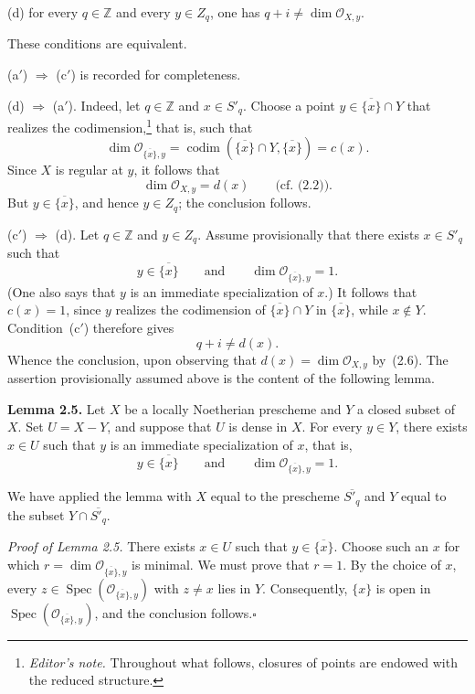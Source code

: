 \documentclass[10pt,a4paper]{article}
\newcommand{\cO}{\mathcal O}
\newcommand{\Spec}{\operatorname{Spec}}
\newcommand{\codim}{\operatorname{codim}}
\newcommand{\markedfootnote}[2]{\begingroup\renewcommand{\thefootnote}{#1}\footnote{#2}\endgroup}
\theoremstyle{sgatheorem}
\theoremstyle{plain}
\numberwithin{equation}{section}
\begin{document}
\medskip
\noindent\textup{(d)} for every $q\in\mathbb Z$ and every $y\in Z_q$,
one has $q+i\ne\dim\cO_{X,y}$.

\medskip
\noindent These conditions are equivalent.

\smallskip
\noindent\textup{(a$'$)} $\Rightarrow$ \textup{(c$'$)} is recorded for
completeness.

\smallskip
\noindent\textup{(d)} $\Rightarrow$ \textup{(a$'$)}. Indeed, let
$q\in\mathbb Z$ and $x\in S'_q$. Choose a point
$y\in\overline{\{x\}}\cap Y$ that realizes the
codimension,\markedfootnote{(6)}{\textit{Editor's note.} Throughout what
follows, closures of points are endowed with the reduced structure.} that is,
such that
\begin{equation}
  \dim\cO_{\overline{\{x\}},y}
  =\codim(\overline{\{x\}}\cap Y,\overline{\{x\}})=c(x).
  \tag{2.5}
\end{equation}
Since $X$ is regular at $y$, it follows that
\begin{equation}
  \dim\cO_{X,y}=d(x)\qquad\text{(cf.~(2.2)).}
  \tag{2.6}
\end{equation}
But $y\in\overline{\{x\}}$, and hence $y\in Z_q$; the conclusion follows.

\smallskip
\noindent\textup{(c$'$)} $\Rightarrow$ \textup{(d)}. Let $q\in\mathbb Z$
and $y\in Z_q$. Assume provisionally that there exists $x\in S'_q$ such
that
\[
  y\in\overline{\{x\}}\qquad\text{and}\qquad
  \dim\cO_{\overline{\{x\}},y}=1.
\]
(One also says that $y$ is an immediate specialization of $x$.) It follows
that $c(x)=1$, since $y$ realizes the codimension of
$\overline{\{x\}}\cap Y$ in $\overline{\{x\}}$, while $x\notin Y$.
Condition~\textup{(c$'$)} therefore gives
\[
  q+i\ne d(x).
\]
Whence the conclusion, upon observing that $d(x)=\dim\cO_{X,y}$ by~(2.6).
The assertion provisionally assumed above is the content of the following
lemma.

\medskip
\noindent\textbf{Lemma 2.5.} Let $X$ be a locally Noetherian prescheme and
$Y$ a closed subset of $X$. Set $U=X-Y$, and suppose that $U$ is dense in
$X$. For every $y\in Y$, there exists $x\in U$ such that $y$ is an immediate
specialization of $x$, that is,
\[
  y\in\overline{\{x\}}\qquad\text{and}\qquad
  \dim\cO_{\overline{\{x\}},y}=1.
\]

We have applied the lemma with $X$ equal to the prescheme
$\overline{S'_q}$ and $Y$ equal to the subset
$Y\cap\overline{S'_q}$.

\medskip
\noindent\textit{Proof of Lemma 2.5.} There exists $x\in U$ such that
$y\in\overline{\{x\}}$. Choose such an $x$ for which
$r=\dim\cO_{\overline{\{x\}},y}$ is minimal. We must prove that $r=1$.
By the choice of $x$, every
$z\in\Spec(\cO_{\overline{\{x\}},y})$ with $z\ne x$ lies in $Y$.
Consequently, $\{x\}$ is open in
$\Spec(\cO_{\overline{\{x\}},y})$, and the conclusion follows.\hfill$\square$
\end{document}

